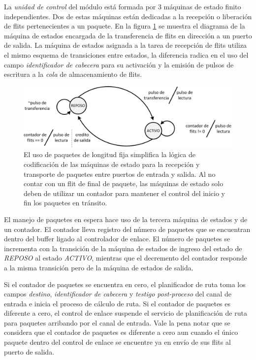 La \textit{unidad de control} del módulo está formada por 3 máquinas de estado finito independientes. Dos de estas máquinas están dedicadas a la recepción o liberación de flits pertenecientes a un paquete. En la figura \ref{fig:ch4_fsm_control_de_enlace} se muestra el diagrama de la máquina de estados encargada de la transferencia de flits en dirección a un puerto de salida. La máquina de estados asignada a la tarea de recepción de flits utiliza el mismo esquema de transiciones entre estados, la diferencia radica en el uso del campo \textit{identificador de cabecera} para su activación y la emisión de pulsos de escritura a la \textit{cola} de almacenamiento de flits.

\begin{figure}
	\begin{center}
		\includegraphics[scale=0.7]{figures/ch4_fsm_control_de_enlace.png}
	\end{center}
	\caption
		{	
			El uso de paquetes de longitud fija simplifica la lógica de codificación de las máquinas de estado para la recepción y transporte de paquetes entre puertos de entrada y salida. Al no contar con un flit de final de paquete, las máquinas de estado solo deben de utilizar un contador para mantener el control del inicio y fin los paquetes en tránsito. 
		}
	\label{fig:ch4_fsm_control_de_enlace}
\end{figure}

El manejo de paquetes en espera hace uso de la tercera máquina de estados y de un contador. El contador lleva registro del número de paquetes que se encuentran dentro del buffer ligado al controlador de enlace. El número de paquetes se incrementa con la transición de la máquina de estados de ingreso del estado de \textit{REPOSO} al estado \textit{ACTIVO}, mientras que el decremento del contador responde a la misma transición pero de la máquina de estados de salida.

Si el contador de paquetes se encuentra en cero, el planificador de ruta toma los campos \textit{destino}, \textit{identificador de cabecera} y \textit{testigo post-proceso} del canal de entrada e inicia el proceso de cálculo de ruta. Si el contador de paquetes es diferente a cero, el control de enlace suspende el servicio de planificación de ruta para paquetes arribando por el canal de entrada. Vale la pena notar que se considera que el contador de paquetes es diferente a cero aun cuando el único paquete dentro del control de enlace se encuentre ya en envío de sus flits al puerto de salida.

